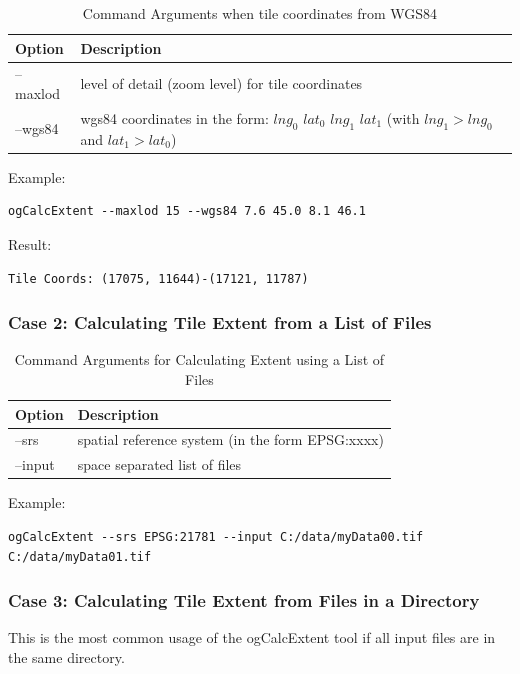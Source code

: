 \documentclass[
	12pt,
	a4paper,
	english,	
	appendixprefix,				     			        
	openany,		     	
	abstracton,		    		    
 	BCOR8mm,		    
]{scrartcl}
\begin{document}
\begin{table}[H]
\centering
\begin{tabular}{|l|p{6cm}|}
\hline
\textbf{Option}	& \textbf{Description}\\
\hline
--maxlod & level of detail (zoom level) for tile coordinates\\
\hline
--wgs84 & wgs84 coordinates in the form: $lng_0$ $lat_0$ $lng_1$ $lat_1$ (with $lng_1>lng_0$ and $lat_1>lat_0$)\\
\hline
\end{tabular}
\caption{Command Arguments when tile coordinates from WGS84}
\end{table}

Example:
\begin{lstlisting}
ogCalcExtent --maxlod 15 --wgs84 7.6 45.0 8.1 46.1
\end{lstlisting}

Result:
\begin{lstlisting}
Tile Coords: (17075, 11644)-(17121, 11787)
\end{lstlisting}

\subsubsection{Case 2: Calculating Tile Extent from a List of Files}

\begin{table}[H]
\centering
\begin{tabular}{|l|p{6cm}|}
\hline
\textbf{Option}	& \textbf{Description}\\
\hline
--srs   & spatial reference system (in the form EPSG:xxxx)\\
\hline
--input & space separated list of files\\
\hline
\end{tabular}
\caption{Command Arguments for Calculating Extent using a List of Files}
\end{table}

Example:
\begin{lstlisting}
ogCalcExtent --srs EPSG:21781 --input C:/data/myData00.tif C:/data/myData01.tif
\end{lstlisting}

\subsubsection{Case 3: Calculating Tile Extent from Files in a Directory}

This is the most common usage of the ogCalcExtent tool if all input files are in the same directory.
       
\end{document}
